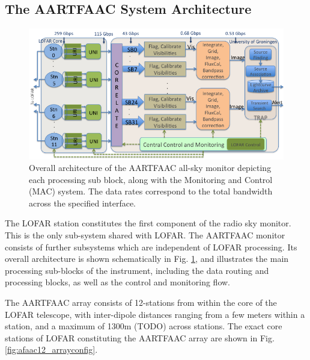 \documentclass{ws-jai}
\begin{document}
\subsection {\label{subsec:aartfaac}  The AARTFAAC System Architecture}
\begin{figure}[htbp]
\centering
\includegraphics[width=1\textwidth]{Figs/Overall_arch_afaac/Slide1.png}
\caption {Overall  architecture of the  AARTFAAC all-sky monitor  depicting each
  processing sub block, along with the  Monitoring and Control (MAC) system. The
  data rates correspond to the total bandwidth across the specified interface. }
\label{fig:afaac_arch}
\end{figure}

The LOFAR station constitutes the first component of the radio sky monitor. This
is the  only sub-system  shared with  LOFAR.  The  AARTFAAC monitor  consists of
further  subsystems which  are  independent of  LOFAR  processing.  Its  overall
architecture   is  shown   schematically  in   Fig.  \ref{fig:afaac_arch},   and
illustrates the main processing sub-blocks of the instrument, including the data
routing and processing blocks, as well as the control and monitoring flow.

The AARTFAAC  array consists of  12-stations from within  the core of  the LOFAR
telescope,  with inter-dipole  distances  ranging  from a  few  meters within  a
station, and a maximum of 1300m  (TODO) across stations. The exact core stations
of    LOFAR     constituting    the     AARTFAAC    array    are     shown    in
Fig. \ref{fig:afaac12_arrayconfig}.
\end{document}
